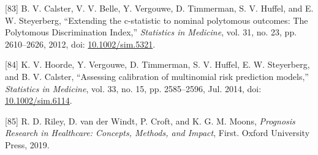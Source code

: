 \documentclass[
]{article}
\newenvironment{cslreferences}%
  {}%
  {\par}
\begin{document}
\begin{cslreferences}
\leavevmode\hypertarget{ref-calster_extending_2012-1}{}%
{[}83{]} B. V. Calster, V. V. Belle, Y. Vergouwe, D. Timmerman, S. V. Huffel, and E. W. Steyerberg, ``Extending the c-statistic to nominal polytomous outcomes: The Polytomous Discrimination Index,'' \emph{Statistics in Medicine}, vol. 31, no. 23, pp. 2610--2626, 2012, doi: \href{https://doi.org/10.1002/sim.5321}{10.1002/sim.5321}.

\leavevmode\hypertarget{ref-hoorde_assessing_2014}{}%
{[}84{]} K. V. Hoorde, Y. Vergouwe, D. Timmerman, S. V. Huffel, E. W. Steyerberg, and B. V. Calster, ``Assessing calibration of multinomial risk prediction models,'' \emph{Statistics in Medicine}, vol. 33, no. 15, pp. 2585--2596, Jul. 2014, doi: \href{https://doi.org/10.1002/sim.6114}{10.1002/sim.6114}.

\leavevmode\hypertarget{ref-riley_prognosis_2019}{}%
{[}85{]} R. D. Riley, D. van der Windt, P. Croft, and K. G. M. Moons, \emph{Prognosis Research in Healthcare: Concepts, Methods, and Impact}, First. Oxford University Press, 2019.
\end{cslreferences}
\end{document}
